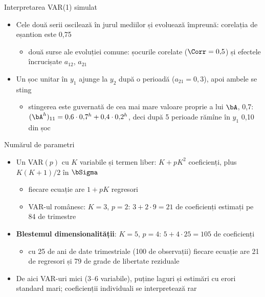 \begin{frame}{Interpretarea VAR(1) simulat}
\itemsize{\small}
\begin{itemize}
    \item Cele două serii oscilează în jurul mediilor și evoluează împreună: corelația de eșantion este 0{,}75
    \begin{itemize}
        \item două surse ale evoluției comune: șocurile corelate ($\Corr = 0{,}5$) și efectele încrucișate $a_{12}$, $a_{21}$
    \end{itemize}
    \item Un șoc unitar în $y_1$ ajunge la $y_2$ după o perioadă ($a_{21} = 0{,}3$), apoi ambele se sting
    \begin{itemize}
        \item stingerea este guvernată de cea mai mare valoare proprie a lui $\bA$, 0{,}7: $(\bA^h)_{11} = 0{,}6 \cdot 0{,}7^h + 0{,}4 \cdot 0{,}2^h$, deci după 5 perioade rămîne în $y_1$ 0{,}10 din șoc
    \end{itemize}
\end{itemize}
\end{frame}

\begin{frame}{Numărul de parametri}
\itemsize{\small}
\begin{itemize}
    \item Un VAR$(p)$ cu $K$ variabile și termen liber: $K + pK^2$ coeficienți, plus $K(K+1)/2$ în $\bSigma$
    \begin{itemize}
        \item fiecare ecuație are $1 + pK$ regresori
        \item VAR-ul românesc: $K = 3$, $p = 2$: $3 + 2 \cdot 9 = 21$ de coeficienți estimați pe 84 de trimestre
    \end{itemize}
    \item \textbf{Blestemul dimensionalității}: $K = 5$, $p = 4$: $5 + 4 \cdot 25 = 105$ de coeficienți
    \begin{itemize}
        \item cu 25 de ani de date trimestriale (100 de observații) fiecare ecuație are 21 de regresori și 79 de grade de libertate reziduale
    \end{itemize}
    \item De aici VAR-uri mici (3--6 variabile), puține laguri și estimări cu erori standard mari; coeficienții individuali se interpretează rar
\end{itemize}
\end{frame}

